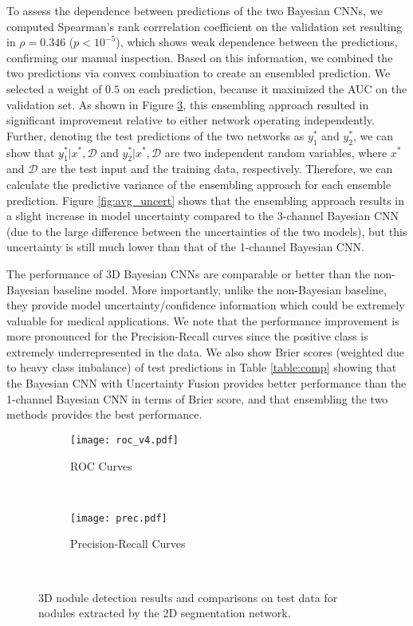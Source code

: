 \documentclass{article}
\begin{document}
To assess the dependence between predictions of the two Bayesian CNNs, we computed Spearman's rank corrrelation coefficient on the validation set resulting in $\rho=0.346$ ($p<10^{-5}$), which shows weak dependence between the predictions, confirming our manual inspection. Based on this information, we combined the two predictions via convex combination to create an ensembled prediction. We selected a weight of $0.5$ on each prediction, because it maximized the AUC on the validation set. As shown in Figure \ref{fig:results}, this ensembling approach resulted in significant improvement relative to either network operating independently. Further, denoting the test predictions of the two networks as $y_1^*$ and $y_2^*$, we can show that $y_1^*|x^*,\mathcal{D}$ and $y_2^*|x^*,\mathcal{D}$ are two independent random variables, where $x^*$ and $\mathcal{D}$ are the test input and the training data, respectively. Therefore, we can calculate the predictive variance of the ensembling approach for each ensemble prediction. 
Figure \ref{fig:avg_uncert} shows that the ensembling approach results in a slight increase in model uncertainty compared to the 3-channel Bayesian CNN (due to the large difference between the uncertainties of the two models), but this uncertainty is still much lower than that of the 1-channel Bayesian CNN. 

The performance of 3D Bayesian CNNs are comparable or better than the non-Bayesian baseline model. More importantly, unlike the non-Bayesian baseline, they provide model uncertainty/confidence information which could be extremely valuable for medical applications. We note that the performance improvement is more pronounced for the Precision-Recall curves since the positive class is extremely underrepresented in the data. 
We also show Brier scores \cite{deGroot83} (weighted due to heavy class imbalance) of test predictions in Table \ref{table:comp} 
showing that the Bayesian CNN with Uncertainty Fusion provides better performance than the 1-channel Bayesian CNN in terms of Brier score, and that ensembling the two methods provides the best performance. 



\begin{figure}[h!]
	\centering
	\begin{subfigure}[b]{0.49\textwidth}
		\texttt{[image: roc\_v4.pdf]}
		\caption{ROC Curves}
		\label{fig:roc}
	\end{subfigure}
	~ %
	\begin{subfigure}[b]{0.49\textwidth}
		\texttt{[image: prec.pdf]}%
		\caption{Precision-Recall Curves}
		\label{fig:prec}
	\end{subfigure}
	~ %
	\caption{3D nodule detection results and comparisons on test data for nodules extracted by the 2D segmentation network. }\label{fig:results}
\end{figure}
\end{document}
